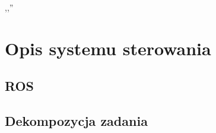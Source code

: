 

\begin{savequote}[70mm]
,,''
\qauthor{}
\end{savequote}


\chapter{Opis systemu sterowania}
\label{chap:software}

\section{ROS}
\section{Dekompozycja zadania}
